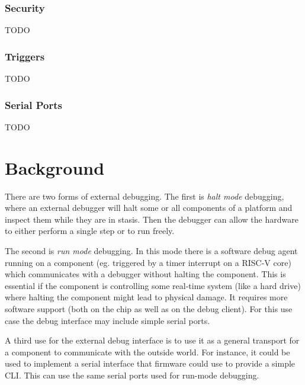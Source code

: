 \documentclass{article}
\begin{document}
\subsubsection{Security}

TODO

\subsubsection{Triggers}

TODO

\subsubsection{Serial Ports}

TODO

\section{Background}

There are two forms of external debugging. The first is \emph{halt mode}
debugging, where an external debugger will halt some or all components of a
platform and inspect them while they are in stasis. Then the debugger can allow
the hardware to either perform a single step or to run freely.

The second is \emph{run mode} debugging.  In this mode there is a software
debug agent running on a component (eg.  triggered by a timer interrupt on a
RISC-V core) which communicates with a debugger without halting the component.
This is essential if the component is controlling some real-time system (like a
hard drive) where halting the component might lead to physical damage. It
requires more software support (both on the chip as well as on the debug
client).  For this use case the debug interface may include simple serial
ports.

A third use for the external debug interface is to use it as a general
transport for a component to communicate with the outside world. For instance,
it could be used to implement a serial interface that firmware could use to
provide a simple CLI. This can use the same serial ports used for run-mode
debugging.
\end{document}

